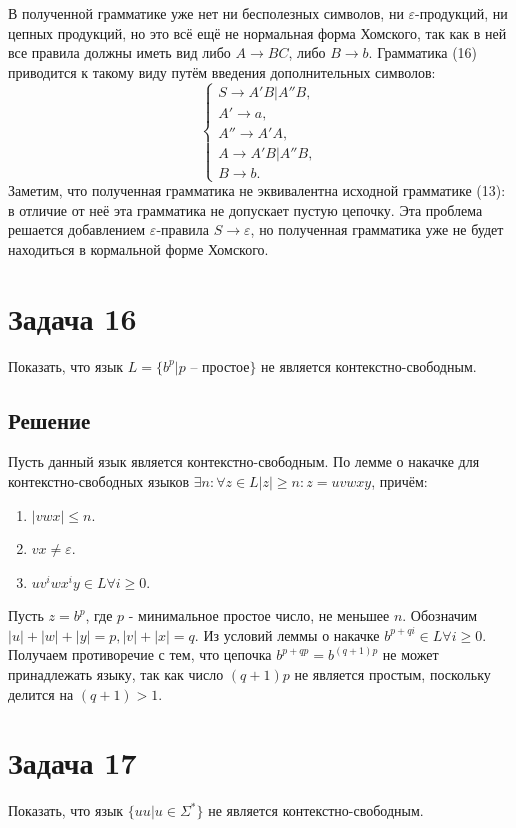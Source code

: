\documentclass[11pt]{article}
\begin{document}
В полученной грамматике уже нет ни бесполезных символов, ни \(\varepsilon\)-продукций, ни цепных
продукций, но это всё ещё не нормальная форма Хомского, так как в ней все правила должны иметь
вид либо \(A \rightarrow BC\), либо \(B \rightarrow b\). Грамматика (16) приводится к такому виду
путём введения дополнительных символов:
\begin{equation}
\begin{cases}
S   \rightarrow A'B | A''B, \\
A'  \rightarrow a, \\
A'' \rightarrow A'A, \\
A   \rightarrow A'B | A''B, \\
B   \rightarrow b.
\end{cases}
\end{equation}
Заметим, что полученная грамматика не эквивалентна исходной грамматике (13): в отличие от неё
эта грамматика не допускает пустую цепочку. Эта проблема решается добавлением \(\varepsilon\)-правила
\(S \rightarrow \varepsilon\), но полученная грамматика уже не будет находиться в кормальной форме
Хомского.
\section{Задача 16}
\label{sec:org71a0505}
Показать, что язык \(L = \{b^p | p\text{ -- простое}\}\) не является контекстно-свободным.
\subsection{Решение}
\label{sec:org5877656}
Пусть данный язык является контекстно-свободным. По лемме о накачке для контекстно-свободных
языков \(\exists n: \forall z \in L |z| \geq n: z = uvwxy\), причём:
\begin{enumerate}
\item \(|vwx| \leq n\).
\item \(vx \neq \varepsilon\).
\item \(uv^iwx^iy \in L \forall i \geq 0\).
\end{enumerate}
Пусть \(z = b^p\), где \(p\) - минимальное простое число, не меньшее \(n\). Обозначим
\(|u| + |w| + |y| = p, |v| + |x| = q\). Из условий леммы о накачке \(b^{p + qi} \in L \forall i \geq 0\).
Получаем противоречие с тем, что цепочка \(b^{p + qp} = b^{(q + 1)p}\) не может принадлежать языку,
так как число \((q + 1)p\) не является простым, поскольку делится на \((q + 1) > 1\).
\section{Задача 17}
\label{sec:org4add8c8}
Показать, что язык \(\{uu | u \in \Sigma^*\}\) не является контекстно-свободным.
\end{document}

